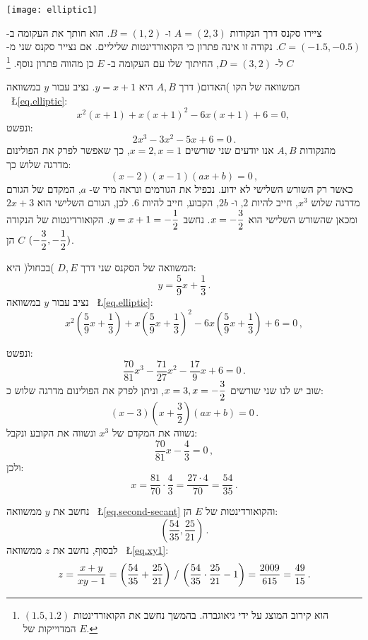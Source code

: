 \np

\begin{center}
\texttt{[image: elliptic1]}
\end{center}


ציירו סקנס דרך הנקודות
$A=(2,3)$
ו-%
$B=(1,2)$.
הוא חותך את העקומה ב-%
$C=(-1.5,-0.5)$.
נקודה זו אינה פתרון כי הקואורדינטות שליליים. אם נצייר סקנס שני מ-%
$C$
ל-%
$D=(3,2)$,
החיתוך שלו עם העקומה ב-%
$E$
כן מהווה פתרון נוסף.%
\footnote{$(1.5,1.2)$
הוא קירוב המוצג על ידי גיאוגברה. בהמשך נחשב את הקואורדינטות המדוייקות של
$E$.}

המשוואה של הקו )האדום( דרך 
$A,B$
היא
$y=x+1$. 
נציב עבור 
$y$
במשוואה%
~\L{\ref{eq.elliptic}}:
\[
x^2(x+1) + x(x+1)^2 -6x(x+1) +6 =0,\,
\]
ונפשט:
\[
2x^3 -3x^2 -5x +6 =0\,.
\]
מהנקודות
$A,B$
אנו יודעים שני שורשים
$x=2,x=1$,
כך שאפשר לפרק את הפולינום מדרגה שלוש כך:
\[
(x-2)(x-1)(ax+b)=0\,,
\]
כאשר רק השורש השלישי לא ידוע. נכפיל את הגורמים ונראה מיד ש-%
$a$,
המקדם של הגורם מדרגה שלוש
$x^3$,
חייב להיות
$2$,
ו-%
$2b$,
הקבוע, חייב להיות
$6$.
לכן, הגורם השלישי הוא
$2x+3$
ומכאן שהשורש השלישי הוא
$x=-\displaystyle\frac{3}{2}$.
נחשב
$y=x+1=-\displaystyle\frac{1}{2}$.
הקואורדינטות של הנקודה
$C$
הן
$(-\displaystyle\frac{3}{2},-\displaystyle\frac{1}{2})$.

המשוואה של הסקנס שני דרך
$D,E$
)בכחול( היא:
\begin{equation}
y = \frac{5}{9}x + \frac{1}{3}\,.\label{eq.second-secant}
\end{equation}
נציב עבור 
$y$
במשוואה 
~\L{\ref{eq.elliptic}}:
\[
x^2\left(\frac{5}{9}x + \frac{1}{3}\right) + x\left(\frac{5}{9}x + \frac{1}{3}\right)^2 -6x\left(\frac{5}{9}x + \frac{1}{3}\right) +6 =0\,,
\]

\np

ונפשט:
\[
\frac{70}{81}x^3 - \frac{71}{27}x^2 - \frac{17}{9}x +6 =0\,.
\]
שוב יש לנו שני שורשים
$x=3,x=-\displaystyle\frac{3}{2}$,
וניתן לפרק את הפולינום מדרגה שלוש כ:
\[
(x-3)\left(x+\frac{3}{2}\right)(ax+b)=0\,.
\]
נשווה את המקדם של 
$x^3$
ונשווה את הקובע ונקבל:
\[
\frac{70}{81}x - \frac{4}{3}=0\,,
\]
ולכן:
\[
x=\frac{81}{70}\cdot \frac{4}{3}= \frac{27\cdot 4}{70} = \frac{54}{35}\,.
\]

נחשב את
$y$
ממשוואה
~\L{\ref{eq.second-secant}}
והקואורדינטות של
$E$
הן:
\[
\left(\frac{54}{35}, \frac{25}{21}\right)\,.
\]
לבסוף, נחשב את
$z$
ממשוואה
~\L{\ref{eq.xy1}}:
\[
z=\frac{x+y}{xy-1}=%
\left(\disfrac{54}{35} + \disfrac{25}{21}\right)%
 \, / \,%
\left(\disfrac{54}{35}\cdot\disfrac{25}{21}-1\right)=%
\frac{2009}{615} = \frac{49}{15}\,.
\]

